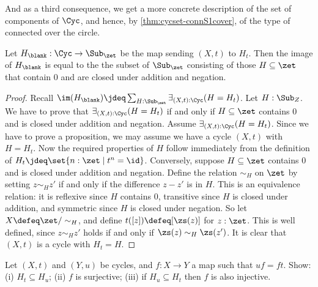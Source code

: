And as a third consequence,
we get a more concrete description of the set of components of $\Cyc$,
and hence, by \cref{thm:cycset-connS1cover},
of the type of connected \coverings over the circle.
\begin{corollary}\label{cor:set-trunc-cyc}
  Let $H_\blank : \Cyc \to \Sub_\zet$ be the map sending $(X,t)$ to $H_t$.
  Then the image of $H_\blank$ is equal to the 
  the subset of $\Sub_\zet$ consisting of those
  $H\subseteq\zet$ that contain $0$ and are closed under addition and negation.
\end{corollary}
\begin{proof}
Recall $\im(H_\blank)\jdeq\sum_{H:\Sub_\zet}\exists_{(X,t):\Cyc}(H=H_t)$.
Let $H:\Sub_Z$.
We have to prove that $\exists_{(X,t):\Cyc}(H=H_t)$
if and only if $H\subseteq\zet$ contains $0$ and is closed under addition 
and negation. 
Assume $\exists_{(X,t):\Cyc}(H=H_t)$.
Since we have to prove a proposition, we may assume we have a cycle $(X,t)$ with
$H=H_t$. Now the required properties of $H$ follow immediately from
the definition of $H_t\jdeq\set{n:\zet \mid t^n = \id}$.
Conversely, suppose $H \subseteq \zet$ contains $0$ and 
  is closed under addition and negation.
  Define the relation $\sim_H$ on $\zet$ by setting $z \sim_H z'$ if and only if
  the difference $z-z'$ is in $H$.
  This is an equivalence relation:
  it is reflexive since $H$ contains $0$,
  transitive since $H$ is closed under addition,
  and symmetric since $H$ is closed under negation.
  So let $X \defeq \zet/\sim_H$, and define $t([z])\defeq[\zs(z)]$
  for $z:\zet$.
  This is well defined, since $z \sim_H z'$ holds if and only if
  $\zs(z) \sim_H \zs(z')$.
  It is clear that $(X,t)$ is a cycle with $H_t = H$.
\end{proof}

\begin{xca}\label{xca:map-of-cycles}
Let $(X,t)$ and $(Y,u)$ be cycles, and $f:X\to Y$ a map such that $uf=ft$.
Show: (i) $H_t \subseteq H_u$; (ii) $f$ is surjective; (iii) 
if $H_u \subseteq H_t$ then $f$ is also injective.
\end{xca}

